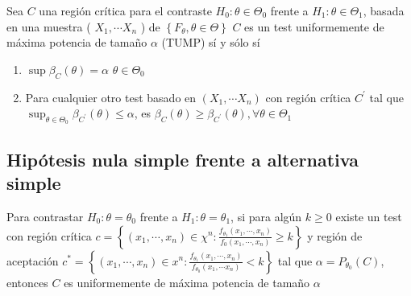 \begin{proposición}
Sea $C$ una región crítica para el contraste $H_{0}: \theta \in \Theta_{0}$ frente a $H_{1}: \theta \in \Theta_{1}$, basada en una muestra ( $X_{1}, \cdots X_{n}$ ) de $\left\{F_{\theta}, \theta \in \Theta\right\}$ $C$ es un test uniformemente de máxima potencia de tamaño $\alpha$ (TUMP) sí y sólo sí
\begin{enumerate}
\item $\sup \beta_{C}(\theta)=\alpha$ $\theta \in \Theta_{0}$
\item Para cualquier otro test basado en $\left(X_{1}, \cdots X_{n}\right)$ con región crítica $C^{\prime}$ tal que $\sup _{\theta \in \Theta_{0}} \beta_{C^{\prime}}(\theta) \leq \alpha$, es $\beta_{C}(\theta) \geq \beta_{C^{\prime}}(\theta), \forall \theta \in \Theta_{1}$
\end{enumerate}
\end{proposición}

\subsection{Hipótesis nula simple frente a alternativa simple}

\begin{teorema}  
Para contrastar $H_{0}: \theta=\theta_{0}$ frente a $H_{1}: \theta=\theta_{1}$, si para algún $k \geq 0$ existe un test con región crítica $c=\left\{\left(x_{1}, \cdots, x_{n}\right) \in \chi^{n}: \frac{f_{\theta_{1}}\left(x_{1}, \cdots, x_{n}\right)}{f_{0}\left(x_{1}, \cdots, x_{n}\right)} \geq k\right\}$ y región de aceptación $c^{*}=\left\{\left(x_{1}, \cdots, x_{n}\right) \in x^{n}: \frac{f_{\theta_{1}}\left(x_{1}, \cdots, x_{n}\right)}{f_{\theta_{0}}\left(x_{1}, \cdots x_{n}\right)}<k\right\}$ tal que $\alpha=P_{\theta_{0}}(C)$, entonces $C$ es uniformemente de máxima potencia de tamaño $\alpha$
\end{teorema}

